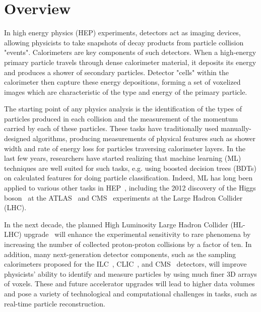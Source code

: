 \chapter{Overview}

In high energy physics (HEP) experiments, detectors act as imaging devices, allowing physicists to take snapshots of decay products from particle collision "events". Calorimeters are key components of such detectors. When a high-energy primary particle travels through dense calorimeter material, it deposits its energy and produces a shower of secondary particles. Detector "cells" within the calorimeter then capture these energy depositions, forming a set of voxelized images which are characteristic of the type and energy of the primary particle. %

The starting point of any physics analysis is the identification of the types of particles produced in each collision and the measurement of the momentum carried by each of these particles. These tasks have traditionally used manually-designed algorithms, producing measurements of physical features such as shower width and rate of energy loss for particles traversing calorimeter layers.
In the last few years, researchers have started realizing that machine learning (ML) techniques are well suited for such tasks, 
e.g. using boosted decision trees (BDTs) on calculated features for doing particle classification. Indeed, ML has long been applied to various other tasks in HEP~\cite{Denby:1987rk,Peterson:1988gs,Abreu:1992jp}, including the 2012 discovery of the Higgs boson~\cite{HiggsATLAS,HiggsCMS} at the ATLAS~\cite{Aad:2008zzm} and CMS~\cite{Chatrchyan:2008aa} experiments at the Large Hadron Collider (LHC). 

In the next decade, the planned High Luminosity Large Hadron Collider (HL-LHC) upgrade~\cite{Apollinari:2284929} will enhance
the experimental sensitivity to rare phenomena by increasing the number of collected proton-proton collisions by a factor of ten. In addition, many next-generation detector components, such as the sampling calorimeters proposed for the ILC~\cite{ILC}, CLIC~\cite{CLIC}, and CMS~\cite{CMSCollaboration:2015zni} detectors, will improve physicists' ability to identify and measure particles by using much finer 3D arrays of voxels. These and future accelerator upgrades will lead to higher data volumes and pose a variety of technological and computational challenges in tasks, such as real-time particle reconstruction.

